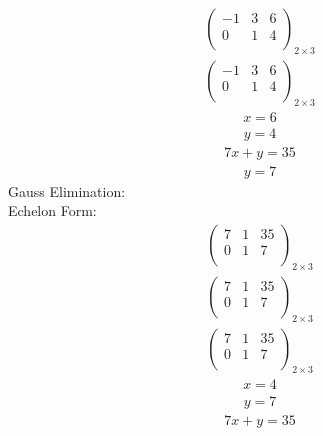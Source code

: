 \documentclass{article}
\begin{document}
\begin{align*}
\left(
\begin{array}{cc|c}
-1 & 3 & 6\\
0 & 1 & 4\\
\end{array}
\right)_{2\times 3}
\end{align*}
\begin{align*}
\left(
\begin{array}{cc|c}
-1 & 3 & 6\\
0 & 1 & 4\\
\end{array}
\right)_{2\times 3}
\end{align*}
\begin{align*}
x=6\end{align*}
\begin{align*}
y=4\end{align*}
\begin{align*}
7x + y=35\end{align*}
\begin{align*}
y=7\end{align*}
Gauss Elimination:\\
Echelon Form:\\
\begin{align*}
\left(
\begin{array}{cc|c}
7 & 1 & 35\\
0 & 1 & 7\\
\end{array}
\right)_{2\times 3}
\end{align*}
\begin{align*}
\left(
\begin{array}{cc|c}
7 & 1 & 35\\
0 & 1 & 7\\
\end{array}
\right)_{2\times 3}
\end{align*}
\begin{align*}
\left(
\begin{array}{cc|c}
7 & 1 & 35\\
0 & 1 & 7\\
\end{array}
\right)_{2\times 3}
\end{align*}
\begin{align*}
x=4\end{align*}
\begin{align*}
y=7\end{align*}
\begin{align*}
7x + y=35\end{align*}
\end{document}
